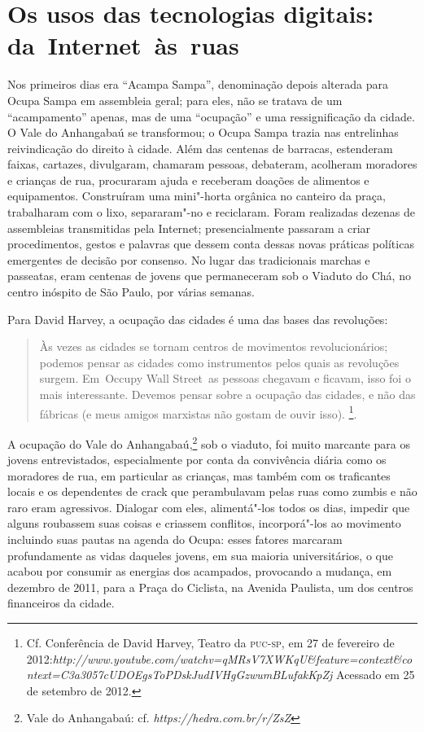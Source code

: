 \section{Os usos das tecnologias digitais: da~Internet~às~ruas}

Nos primeiros dias era ``Acampa Sampa'', denominação depois alterada
para Ocupa Sampa em assembleia geral; para eles, não se tratava de um
``acampamento'' apenas, mas de uma ``ocupação'' e uma ressignificação da
cidade. O Vale do Anhangabaú se transformou; o Ocupa Sampa trazia nas
entrelinhas reivindicação do direito à cidade. Além das centenas de
barracas, estenderam faixas, cartazes, divulgaram, chamaram pessoas,
debateram, acolheram moradores e crianças de rua, procuraram ajuda e
receberam doações de alimentos e equipamentos. Construíram uma
mini"-horta orgânica no canteiro da praça, trabalharam com o lixo,
separaram"-no e reciclaram. Foram realizadas dezenas de assembleias
transmitidas pela Internet; presencialmente passaram a criar
procedimentos, gestos e palavras que dessem conta dessas novas práticas
políticas emergentes de decisão por consenso. No lugar das tradicionais
marchas e passeatas, eram centenas de jovens que permaneceram sob o
Viaduto do Chá, no centro inóspito de São Paulo, por várias semanas.

Para David Harvey, a ocupação das cidades é uma das bases das
revoluções:

\begin{quote}
Às vezes as cidades se tornam centros de movimentos revolucionários;
podemos pensar as cidades como instrumentos pelos quais as revoluções
surgem. Em~Occupy Wall Street~as pessoas chegavam e ficavam, isso foi o
mais interessante. Devemos pensar sobre a ocupação das cidades, e não
das fábricas (e meus amigos marxistas não gostam de ouvir isso).
\footnote{Cf. Conferência de David Harvey, Teatro da \textsc{puc}-\textsc{sp}, em 27 de
  fevereiro de
  2012:\emph{http://www.youtube.com/watchv=qMRsV7XWKqU\&feature=context\&context=C3a3057cUDOEgsToPDskJudIVHgGzwumBLufakKpZj} %
  Acessado em 25 de setembro de 2012.}.
\end{quote}

A ocupação do Vale do Anhangabaú,\footnote{Vale do Anhangabaú: cf.
  \emph{https://hedra.com.br/r/ZsZ}} sob o
viaduto, foi muito marcante para os jovens entrevistados,
especialmente por conta da convivência diária como os moradores de rua,
em particular as crianças, mas também com os traficantes locais e os
dependentes de crack que perambulavam pelas ruas como zumbis e não raro
eram agressivos. Dialogar com eles, alimentá"-los todos os dias, impedir
que alguns roubassem suas coisas e criassem conflitos, incorporá"-los ao
movimento incluindo suas pautas na agenda do Ocupa: esses fatores
marcaram profundamente as vidas daqueles jovens, em sua maioria
universitários, o que acabou por consumir as energias dos
acampados, provocando a mudança, em dezembro de 2011, para a Praça do
Ciclista, na Avenida Paulista, um dos centros financeiros da cidade.

